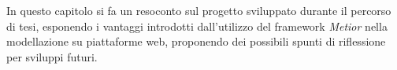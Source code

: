 In questo capitolo si fa un resoconto sul progetto sviluppato durante il percorso di tesi, esponendo i vantaggi introdotti
dall'utilizzo del framework \emph{Metior} nella modellazione su piattaforme web, proponendo dei possibili spunti di riflessione
per sviluppi futuri.
